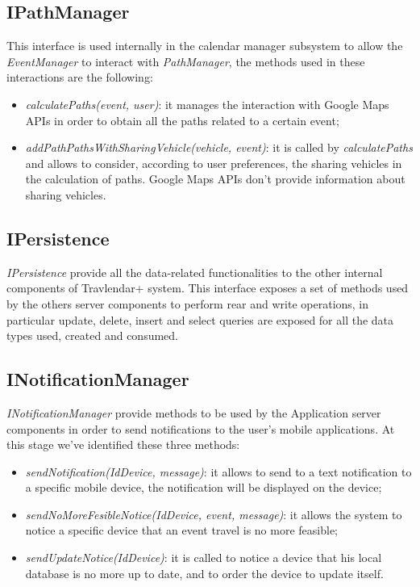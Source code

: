 \subsection{IPathManager}
This interface is used internally in the calendar manager subsystem to allow the \textit{EventManager} to interact with \textit{PathManager}, the methods used in these interactions are the following:
\begin{itemize}
\item \textit{calculatePaths(event, user)}: it manages the interaction with Google Maps APIs in order to obtain all the paths related to a certain event;
\item \textit{addPathPathsWithSharingVehicle(vehicle, event)}: it is called by \textit{calculatePaths} and allows to consider, according to user preferences, the sharing vehicles in the calculation of paths. Google Maps APIs don't provide information about sharing vehicles. 
\end{itemize}

\subsection{IPersistence}
\label{subsect:IPersistence}
\textit{IPersistence} provide all the data-related functionalities to the other internal components of Travlendar+ system. This interface exposes a set of methods used by the others server components to perform rear and write operations, in particular update, delete, insert and select queries are exposed for all the data types used, created and consumed.

\subsection{INotificationManager}
\label{subsect:INotificationManager}
\textit{INotificationManager} provide methods to be used by the Application server components in order to send notifications to the user's mobile applications. At this stage we've identified these three methods:
\begin{itemize}
	\item \textit{sendNotification(IdDevice, message)}: it allows to send to a text notification to a specific mobile device, the notification will be displayed on the device;
	\item \textit{sendNoMoreFesibleNotice(IdDevice, event, message)}: it allows the system to notice a specific device that an event travel is no more feasible;
	\item \textit{sendUpdateNotice(IdDevice)}: it is called to notice a device that his local database is no more up to date, and to order the device to update itself.
\end{itemize}

